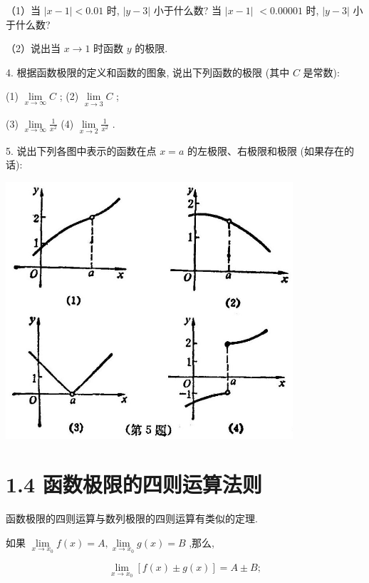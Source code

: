 \documentclass[10pt]{article}
\begin{document}
（1）当 \(\left| {x - 1}\right| < {0.01}\) 时, \(\left| {y - 3}\right|\) 小于什么数? 当 \(\left| {x - 1}\right|\) \(< {0.00001}\) 时, \(\left| {y - 3}\right|\) 小于什么数?

（2）说出当 \(x \rightarrow 1\) 时函数 \(y\) 的极限.

4. 根据函数极限的定义和函数的图象, 说出下列函数的极限 (其中 \(C\) 是常数):

(1) \(\mathop{\lim }\limits_{{x \rightarrow \infty }}C\) ; (2) \(\mathop{\lim }\limits_{{x \rightarrow 3}}C\) ;

(3) \(\mathop{\lim }\limits_{{x \rightarrow \infty }}\frac{1}{{x}^{2}}\) (4) \(\mathop{\lim }\limits_{{x \rightarrow 2}}\frac{1}{{x}^{2}}\) .

5. 说出下列各图中表示的函数在点 \(x = a\) 的左极限、右极限和极限 (如果存在的话):

\begin{center}
\includegraphics[max width=0.8\textwidth]{images/01912c18-5c3f-733d-b775-749ba9897a9d_27_586841.jpg}
\end{center}

\section*{1.4 函数极限的四则运算法则}

函数极限的四则运算与数列极限的四则运算有类似的定理.

如果 \(\mathop{\lim }\limits_{{x \rightarrow {x}_{0}}}f\left( x\right) = A,\mathop{\lim }\limits_{{x \rightarrow {x}_{0}}}g\left( x\right) = B\) ,那么,

\[
\mathop{\lim }\limits_{{x \rightarrow {x}_{0}}}\left\lbrack {f\left( x\right) \pm g\left( x\right) }\right\rbrack = A \pm B;
\]
\end{document}
